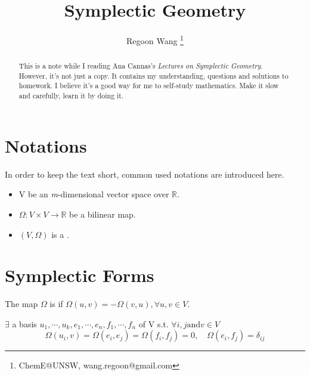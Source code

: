 \documentclass[4paper]{article}
\begin{document}
 
\title{Symplectic Geometry}
\author{Regoon Wang  
\footnote{ChemE@UNSW, wang.regoon@gmail.com}} 


\maketitle
\begin{abstract}
This is a note while I reading Ana Cannas's \textit{Lectures on Symplectic Geometry}. However, it's not
just a copy. It contains my understanding, questions and solutions to homework. I believe it's a good 
way for me to self-study mathematics. Make it slow and carefully, learn it by doing it.
\end{abstract} 

\tableofcontents
\section{Notations}
In order to keep the text short, common used notations are introduced here.
\begin{itemize}
\item V be an \textit{m}-dimensional vector space over $\mathbb{R}$. 
\item $\Omega:V\times V\rightarrow \mathbb{R}$ be a bilinear map.
\item $(V,\Omega)$ is a .
\end{itemize}
\section{Symplectic Forms}
\begin{definition}
The map $\Omega$  is  if $\Omega(u,v)=-\Omega(v,u), \forall u,v\in V$.
\end{definition}
\begin{thm}\label{thm:2.1}
$\exists$ a basis $u_1,\cdots,u_k,e_1,\cdots,e_n,f_1,\cdots,f_n$ of V s.t. $\forall i,j \mathrm{ and } 
v\in V$
\begin{equation*}
\Omega(u_i,v)=\Omega(e_i,e_j)=\Omega(f_i,f_j)=0,\quad\Omega(e_i,f_j)=\delta_{ij}
\end{equation*}
\end{thm}
\end{document}
